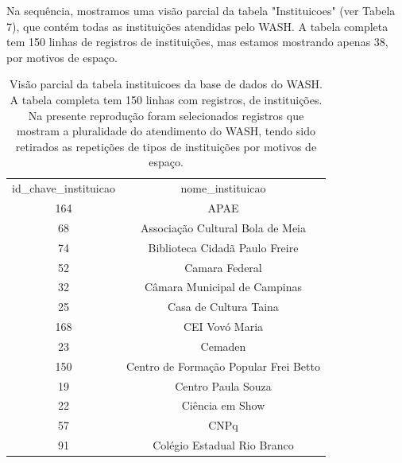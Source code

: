 Na sequência, mostramos uma visão parcial da tabela "Instituicoes" (ver Tabela 7), que contém todas as instituições atendidas pelo WASH. A tabela completa tem 150 linhas de registros de instituições, mas estamos mostrando apenas 38, por motivos de espaço.





\begin{table}[htb]
\tiny
\caption{\label{025a2a6fc8be57e0e8305d2e65ad8cc8f02f2308}Visão parcial da tabela instituicoes da base de dados do WASH. A tabela completa tem 150 linhas com registros, de instituições. Na presente reprodução foram selecionados registros que mostram a pluralidade do atendimento do WASH, tendo sido retirados as repetições de tipos de instituições por motivos de espaço.}

\centering
\begin{tabular}{|c|c|}
\hline
id\_chave\_instituicao  &  nome\_instituicao \\
                  164  &  APAE  \\
                   68  &  Associação Cultural Bola de Meia \\
                   74  &  Biblioteca Cidadã Paulo Freire  \\
                   52  &  Camara Federal \\
                   32  &  Câmara Municipal de Campinas                                                      \\
                   25  &  Casa de Cultura Taina                                                             \\
                  168  &  CEI Vovó Maria                                                                    \\
                   23  &  Cemaden                                                                           \\
                  150  &  Centro de Formação Popular Frei Betto                                             \\
                   19  &  Centro Paula Souza                                                                \\
                   22  &  Ciência em Show                                                                   \\
                   57  &  CNPq                                                                              \\
                   91  &  Colégio Estadual Rio Branco                                                       \\

\end{tabular}
\end{table}
